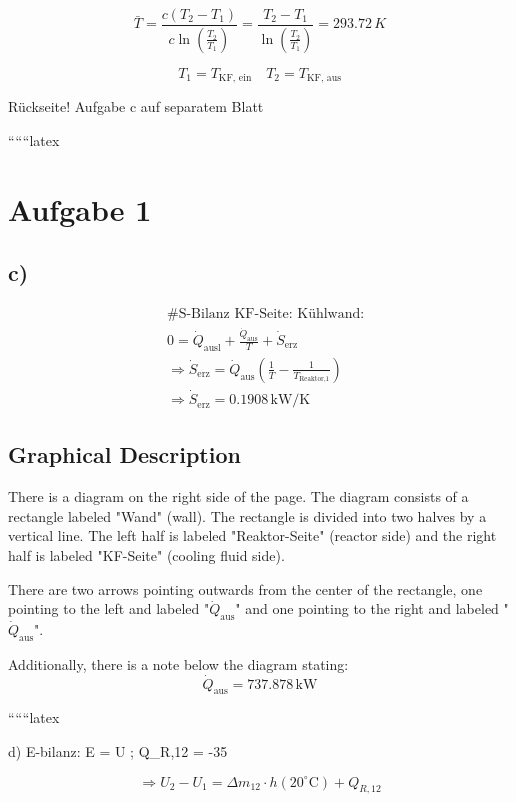 \[
\bar{T} = \frac{c (T_2 - T_1)}{c \ln \left( \frac{T_2}{T_1} \right)} = \frac{T_2 - T_1}{\ln \left( \frac{T_2}{T_1} \right)} = 293.72 \, K
\]

\[
T_1 = T_{\text{KF, ein}} \quad T_2 = T_{\text{KF, aus}}
\]

Rückseite! Aufgabe c auf separatem Blatt

``````latex


\section*{Aufgabe 1}

\subsection*{c)}

\begin{align*}
&\text{\# S-Bilanz KF-Seite: Kühlwand:} \\
&0 = \dot{Q}_{\text{ausl}} + \frac{\dot{Q}_{\text{aus}}}{T} + \dot{S}_{\text{erz}} \\
&\Rightarrow \dot{S}_{\text{erz}} = \dot{Q}_{\text{aus}} \left( \frac{1}{T} - \frac{1}{T_{\text{Reaktor,1}}} \right) \\
&\Rightarrow \dot{S}_{\text{erz}} = 0.1908 \, \text{kW/K}
\end{align*}

\subsection*{Graphical Description}

There is a diagram on the right side of the page. The diagram consists of a rectangle labeled "Wand" (wall). The rectangle is divided into two halves by a vertical line. The left half is labeled "Reaktor-Seite" (reactor side) and the right half is labeled "KF-Seite" (cooling fluid side). 

There are two arrows pointing outwards from the center of the rectangle, one pointing to the left and labeled "\(\dot{Q}_{\text{aus}}\)" and one pointing to the right and labeled "\(\dot{Q}_{\text{aus}}\)". 

Additionally, there is a note below the diagram stating:
\[
\dot{Q}_{\text{aus}} = 737.878 \, \text{kW}
\]

``````latex


d) E-bilanz: \quad \Delta E = \Delta U \quad ; \quad Q_{R,12} = -35 \, 

\[
\Rightarrow U_2 - U_1 = \Delta m_{12} \cdot h(20^\circ \text{C}) + Q_{R,12}
\]


